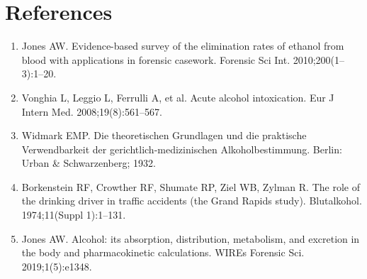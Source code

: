\section*{References}
\begin{enumerate}
  \item Jones AW. Evidence-based survey of the elimination rates of ethanol from blood with applications in forensic casework. Forensic Sci Int. 2010;200(1--3):1--20.
  \item Vonghia L, Leggio L, Ferrulli A, et al. Acute alcohol intoxication. Eur J Intern Med. 2008;19(8):561--567.
  \item Widmark EMP. Die theoretischen Grundlagen und die praktische Verwendbarkeit der gerichtlich-medizinischen Alkoholbestimmung. Berlin: Urban \& Schwarzenberg; 1932.
  \item Borkenstein RF, Crowther RF, Shumate RP, Ziel WB, Zylman R. The role of the drinking driver in traffic accidents (the Grand Rapids study). Blutalkohol. 1974;11(Suppl 1):1--131.
  \item Jones AW. Alcohol: its absorption, distribution, metabolism, and excretion in the body and pharmacokinetic calculations. WIREs Forensic Sci. 2019;1(5):e1348.
\end{enumerate}
\clearpage

